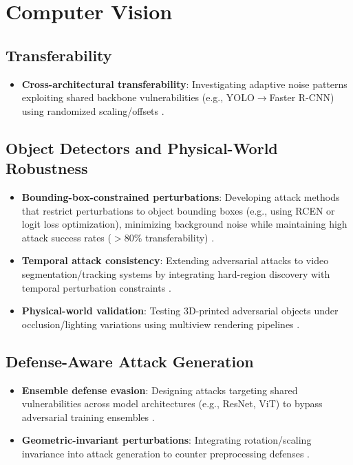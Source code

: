 \documentclass[../main.tex]{subfiles}
\begin{document}
\section{Computer Vision}

\subsection{Transferability}
\begin{itemize}

    \item \textbf{Cross-architectural transferability}: Investigating adaptive noise patterns exploiting shared backbone vulnerabilities (e.g., YOLO$\to$Faster R-CNN) using randomized scaling/offsets \cite{cross_model_transfer}.
\end{itemize}

\subsection{Object Detectors and Physical-World Robustness}
\begin{itemize}
    \item \textbf{Bounding-box-constrained perturbations}: Developing attack methods that restrict perturbations to object bounding boxes (e.g., using RCEN or logit loss optimization), minimizing background noise while maintaining high attack success rates ($>$80\% transferability) \cite{bounding_box_attacks}.
    \item \textbf{Temporal attack consistency}: Extending adversarial attacks to video segmentation/tracking systems by integrating hard-region discovery with temporal perturbation constraints \cite{video_attacks}.
    \item \textbf{Physical-world validation}: Testing 3D-printed adversarial objects under occlusion/lighting variations using multiview rendering pipelines \cite{3d_physical_attacks}.
\end{itemize}

\subsection{Defense-Aware Attack Generation}
\begin{itemize}
    \item \textbf{Ensemble defense evasion}: Designing attacks targeting shared vulnerabilities across model architectures (e.g., ResNet, ViT) to bypass adversarial training ensembles \cite{ensemble_evasion}.
    \item \textbf{Geometric-invariant perturbations}: Integrating rotation/scaling invariance into attack generation to counter preprocessing defenses \cite{geometric_invariance}.
\end{itemize}
\end{document}
